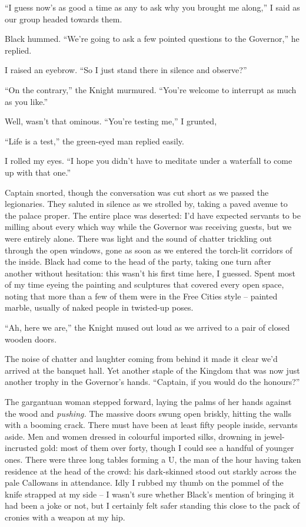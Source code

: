 \documentclass[12pt, openany]{book}
\begin{document}
“I guess now’s as good a time as any to ask why you brought me along,” I said as our group headed towards them.

Black hummed. “We’re going to ask a few pointed questions to the Governor,” he replied.

I raised an eyebrow. “So I just stand there in silence and observe?”

“On the contrary,” the Knight murmured. “You’re welcome to interrupt as much as you like.”

Well, wasn’t that ominous. “You’re testing me,” I grunted,

“Life is a test,” the green-eyed man replied easily.

I rolled my eyes. “I hope you didn’t have to meditate under a waterfall to come up with that one.”

Captain snorted, though the conversation was cut short as we passed the legionaries. They saluted in silence as we strolled by, taking a paved avenue to the palace proper. The entire place was deserted: I’d have expected servants to be milling about every which way while the Governor was receiving guests, but we were entirely alone. There was light and the sound of chatter trickling out through the open windows, gone as soon as we entered the torch-lit corridors of the inside. Black had come to the head of the party, taking one turn after another without hesitation: this wasn’t his first time here, I guessed. Spent most of my time eyeing the painting and sculptures that covered every open space, noting that more than a few of them were in the Free Cities style – painted marble, usually of naked people in twisted-up poses.

“Ah, here we are,” the Knight mused out loud as we arrived to a pair of closed wooden doors.

The noise of chatter and laughter coming from behind it made it clear we’d arrived at the banquet hall. Yet another staple of the Kingdom that was now just another trophy in the Governor’s hands. “Captain, if you would do the honours?”

The gargantuan woman stepped forward, laying the palms of her hands against the wood and \textit{pushing. }The massive doors swung open briskly, hitting the walls with a booming crack. There must have been at least fifty people inside, servants aside. Men and women dressed in colourful imported silks, drowning in jewel-incrusted gold: most of them over forty, though I could see a handful of younger ones. There were three long tables forming a U, the man of the hour having taken residence at the head of the crowd: his dark-skinned stood out starkly across the pale Callowans in attendance. Idly I rubbed my thumb on the pommel of the knife strapped at my side – I wasn’t sure whether Black’s mention of bringing it had been a joke or not, but I certainly felt safer standing this close to the pack of cronies with a weapon at my hip.
\end{document}
